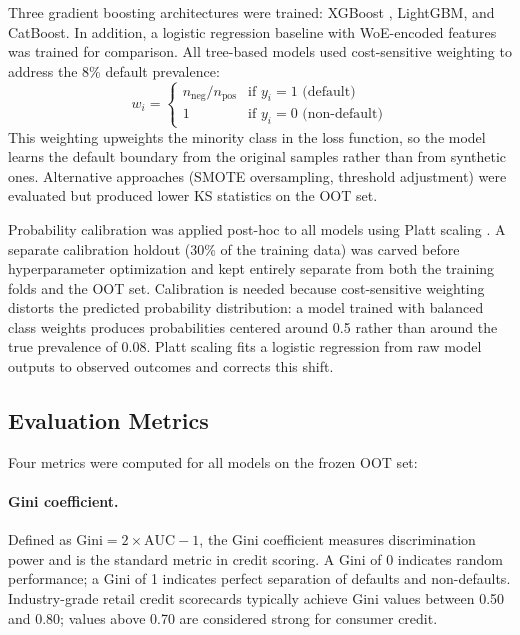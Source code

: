 \documentclass[11pt, a4paper]{article}
\begin{document}
Three gradient boosting architectures were trained: XGBoost \parencite{chen2016xgboost}, LightGBM, and CatBoost. In addition, a logistic regression baseline with WoE-encoded features was trained for comparison. All tree-based models used cost-sensitive weighting to address the 8\% default prevalence:
\begin{equation}
w_i = \begin{cases}
n_{\text{neg}} / n_{\text{pos}} & \text{if } y_i = 1 \text{ (default)}\\
1 & \text{if } y_i = 0 \text{ (non-default)}
\end{cases}
\end{equation}
This weighting upweights the minority class in the loss function, so the model learns the default boundary from the original samples rather than from synthetic ones. Alternative approaches (SMOTE oversampling, threshold adjustment) were evaluated but produced lower KS statistics on the OOT set.

Probability calibration was applied post-hoc to all models using Platt scaling \parencite{niculescu2005predicting}. A separate calibration holdout (30\% of the training data) was carved before hyperparameter optimization and kept entirely separate from both the training folds and the OOT set. Calibration is needed because cost-sensitive weighting distorts the predicted probability distribution: a model trained with balanced class weights produces probabilities centered around 0.5 rather than around the true prevalence of 0.08. Platt scaling fits a logistic regression from raw model outputs to observed outcomes and corrects this shift.

\subsection{Evaluation Metrics}

Four metrics were computed for all models on the frozen OOT set:

\paragraph{Gini coefficient.} Defined as $\text{Gini} = 2 \times \text{AUC} - 1$, the Gini coefficient measures discrimination power and is the standard metric in credit scoring. A Gini of 0 indicates random performance; a Gini of 1 indicates perfect separation of defaults and non-defaults. Industry-grade retail credit scorecards typically achieve Gini values between 0.50 and 0.80; values above 0.70 are considered strong for consumer credit.
\end{document}
